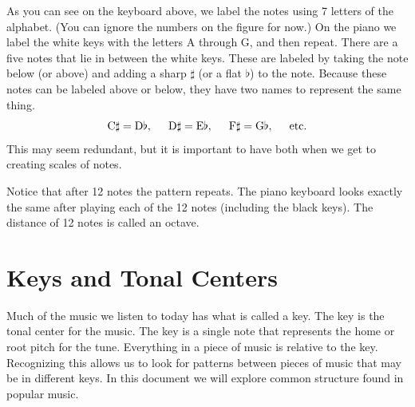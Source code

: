 \documentclass[12pt]{article}
\theoremstyle{definition}
\begin{document}
As you can see on the keyboard above, we label the notes using 7 letters of the alphabet. (You can ignore the numbers on the figure for now.)
On the piano we label the white keys with the letters A through G, and then repeat. There are a five notes that lie in between the white keys. These are labeled by taking the note below (or above) and adding a sharp $\sharp$ (or a flat $\flat$) to the note. 
Because these notes can be labeled above or below, they have two names to represent the same thing. 
$$ \text C \sharp = \text D \flat, \hspace{0.5cm} \text D \sharp = \text E \flat, \hspace{0.5cm} \text F \sharp = \text G \flat, \hspace{0.5cm} \text{etc.}$$
This may seem redundant, but it is important to have both when we get to creating scales of notes. 

Notice that after 12 notes the pattern repeats. The piano keyboard looks exactly the same after playing each of the 12 notes (including the black keys). The distance of 12 notes is called an octave. 

\newpage
\section{Keys and Tonal Centers}

Much of the music we listen to today has what is called a key. 
The key is the tonal center for the music. 
The key is a single note that represents the home or root pitch for the tune. 
Everything in a piece of music is relative to the key. Recognizing this allows us to look for patterns between pieces of music 
that may be in different keys. 
In this document we will explore common structure found in popular music. 
\end{document}
